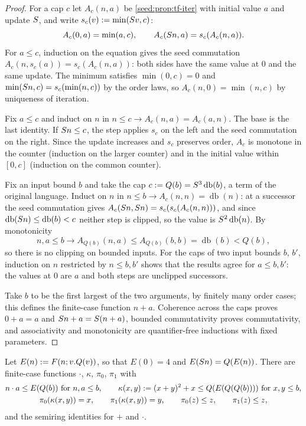 \begin{proof}
For a cap $c$ let $A_c(n,a)$ be \cref{seed:prop:tf-iter} with initial value
$a$ and update $S$, and write $s_c(v)\mathrel{:=}\min(S v,c)$:
\[
 A_c(0,a)=\min(a,c),\qquad A_c(S n,a)=s_c(A_c(n,a)).
\]
For $a\leq c$, induction on the equation gives the seed commutation
$A_c(n,s_c(a))=s_c(A_c(n,a))$: both sides have the same value at $0$ and the
same update. The minimum satisfies $\min(0,c)=0$ and
$\min(S n,c)=s_c(\min(n,c))$ by the order laws, so
$A_c(n,0)=\min(n,c)$ by uniqueness of iteration.

Fix $a\leq c$ and induct on $n$ in $n\leq c\to A_c(n,a)=A_c(a,n)$. The base
is the last identity. If $S n\leq c$, the step applies $s_c$ on the left
and the seed commutation on the right. Since the update increases and $s_c$
preserves order, $A_c$ is monotone in the counter (induction on the larger
counter) and in the initial value within $[0,c]$ (induction on the common
counter).

Fix an input bound $b$ and take the cap $c\mathrel{:=} Q(b)=S^3
\operatorname{db}(b)$, a term of the original language. Induct on $n$ in
$n\leq b\to A_c(n,n)=\operatorname{db}(n)$: at a successor the seed
commutation gives $A_c(S n,S n)=s_c(s_c(A_c(n,n)))$, and since
$\operatorname{db}(S n)\leq\operatorname{db}(b)<c$ neither step is
clipped, so the value is $S^2\operatorname{db}(n)$. By monotonicity
\[
 n,a\leq b\to A_{Q(b)}(n,a)\leq A_{Q(b)}(b,b)=\operatorname{db}(b)<Q(b),
\]
so there is no clipping on bounded inputs. For the caps of two input bounds
$b$, $b'$, induction on $n$ restricted by $n\leq b,b'$ shows that the
results agree for $a\leq b,b'$: the values at $0$ are $a$ and both steps are
unclipped successors.

Take $b$ to be the first largest of the two arguments, by finitely many
order cases; this defines the finite-case function $n+a$. Coherence across
the caps proves $0+a=a$ and $S n+a=S(n+a)$, bounded commutativity
proves commutativity, and associativity and monotonicity are
quantifier-free inductions with fixed parameters.
\end{proof}

\begin{lemma}\label{seed:lem:tf-pair}
Let $E(n)\mathrel{:=} F(n;v.Q(v))$, so that $E(0)=4$ and $E(S n)=Q(E(n))$.
There are finite-case functions $\cdot$, $\kappa$, $\pi_0$, $\pi_1$ with
\begin{gather*}
 n\cdot a\leq E(Q(b))\ \text{for}\ n,a\leq b,\qquad
 \kappa(x,y)\mathrel{:=}(x+y)^2+x\leq Q(E(Q(Q(b))))\ \text{for}\ x,y\leq b,\\
 \pi_0(\kappa(x,y))=x,\qquad\pi_1(\kappa(x,y))=y,\qquad
 \pi_0(z)\leq z,\qquad\pi_1(z)\leq z,
\end{gather*}
and the semiring identities for $+$ and $\cdot$.
\end{lemma}

